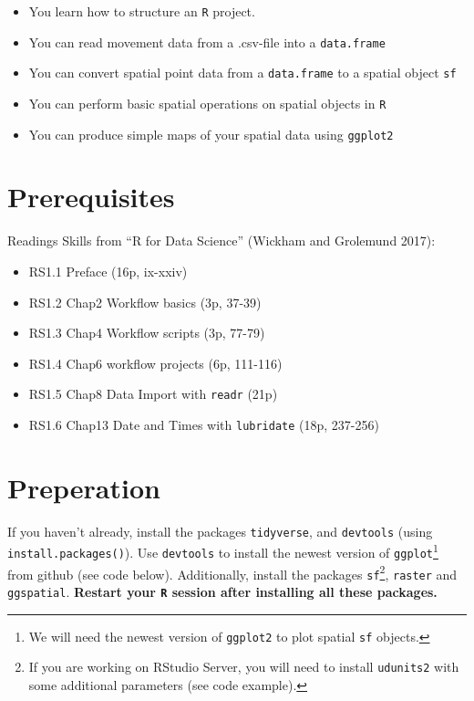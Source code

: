 \documentclass[]{book}
\providecommand{\tightlist}{%
  \setlength{\itemsep}{0pt}\setlength{\parskip}{0pt}}
\let\rmarkdownfootnote\footnote%
\def\footnote{\protect\rmarkdownfootnote}
\theoremstyle{definition}
\theoremstyle{definition}
\theoremstyle{definition}
\theoremstyle{remark}
\begin{document}
\begin{itemize}
\tightlist
\item
  You learn how to structure an \texttt{R} project.
\item
  You can read movement data from a .csv-file into a \texttt{data.frame}
\item
  You can convert spatial point data from a \texttt{data.frame} to a
  spatial object \texttt{sf}
\item
  You can perform basic spatial operations on spatial objects in
  \texttt{R}
\item
  You can produce simple maps of your spatial data using
  \texttt{ggplot2}
\end{itemize}

\section{Prerequisites}\label{prerequisites}

Readings Skills from ``R for Data Science'' (Wickham and Grolemund
2017):

\begin{itemize}
\tightlist
\item
  RS1.1 Preface (16p, ix-xxiv)
\item
  RS1.2 Chap2 Workflow basics (3p, 37-39)
\item
  RS1.3 Chap4 Workflow scripts (3p, 77-79)
\item
  RS1.4 Chap6 workflow projects (6p, 111-116)
\item
  RS1.5 Chap8 Data Import with \texttt{readr} (21p)
\item
  RS1.6 Chap13 Date and Times with \texttt{lubridate} (18p, 237-256)
\end{itemize}

\section{Preperation}\label{preperation}

If you haven't already, install the packages \texttt{tidyverse}, and
\texttt{devtools} (using \texttt{install.packages()}). Use
\texttt{devtools} to install the newest version of
\texttt{ggplot}\footnote{We will need the newest version of
  \texttt{ggplot2} to plot spatial \texttt{sf} objects.} from github
(see code below). Additionally, install the packages
\texttt{sf}\footnote{If you are working on RStudio Server, you will need
  to install \texttt{udunits2} with some additional parameters (see code
  example).}, \texttt{raster} and \texttt{ggspatial}. \textbf{Restart
your \texttt{R} session after installing all these packages.}
\end{document}
